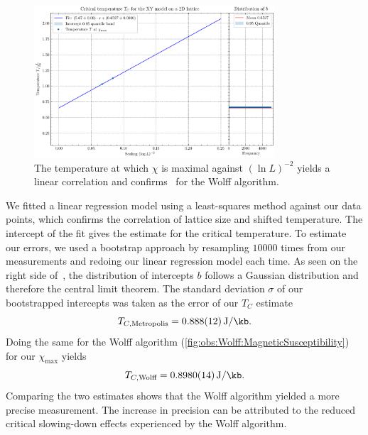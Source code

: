 		\begin{figure}[htbp]
			\centering
			\includegraphics[width=0.8\textwidth]{../figures/Wolff/Critical_Temperature.pdf}
						\caption[Estimating $T_C$ using the Wolff algorithm by plotting $T$ where $\chi$ is maximal against $(\ln L)^{-2}$]{The temperature at which $\chi$ is maximal against $(\ln L)^{-2}$ yields a linear correlation and confirms~ for the Wolff algorithm.}
			\label{fig:critical_temperature_wolf}
		\end{figure}
		
		We fitted a linear regression model using a least-squares method against our data points, which confirms the correlation of lattice size and shifted temperature. The intercept of the fit gives the estimate for the critical temperature. To estimate our errors, we used a bootstrap approach by resampling $\num{10 000}$ times from our measurements and redoing our linear regression model each time. As seen on the right side of~, the distribution of intercepts $b$ follows a Gaussian distribution and therefore the central limit theorem. The standard deviation $\sigma$ of our bootstrapped intercepts was taken as the error of our $T_C$ estimate
		\begin{equation}
			T_{C, \text{Metropolis}} = \SI{0.888(12)}{\J\per\kb}.
		\end{equation}
		Doing the same for the Wolff algorithm (\cref{fig:obs:Wolff:MagneticSusceptibility}) for our $\chi_\text{max}$ yields
		\begin{equation}
			T_{C, \text{Wolff}} = \SI{0.8980(14)}{\J\per\kb}.
		\end{equation}
		Comparing the two estimates shows that the Wolff algorithm yielded a more precise measurement. The increase in precision can be attributed to the reduced critical slowing-down effects experienced by the Wolff algorithm.
		
